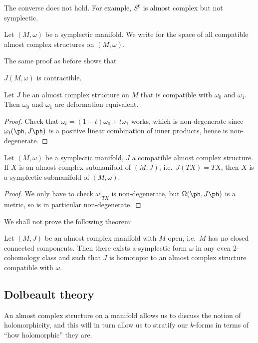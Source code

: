 \documentclass[a4paper]{article}
\begin{document}
The converse does not hold. For example, $S^6$ is almost complex but not symplectic.

\begin{notation}
  Let $(M, \omega)$ be a symplectic manifold. We write  for the space of all compatible almost complex structures on $(M, \omega)$.
\end{notation}
The same proof as before shows that
\begin{prop}
  $J(M, \omega)$ is contractible.\fakeqed
\end{prop}

\begin{prop}
  Let $J$ be an almost complex structure on $M$ that is compatible with $\omega_0$ and $\omega_1$. Then $\omega_0$ and $\omega_1$ are deformation equivalent.
\end{prop}

\begin{proof}
  Check that $\omega_t = (1 - t) \omega_0 + t \omega_1$ works, which is non-degenerate since $\omega_t(\ph, J\ph)$ is a positive linear combination of inner products, hence is non-degenerate.
\end{proof}

\begin{prop}
  Let $(M, \omega)$ be a symplectic manifold, $J$ a compatible almost complex structure. If $X$ is an almost complex submanifold of $(M, J)$, i.e.\ $J(TX) = TX$, then $X$ is a symplectic submanifold of $(M, \omega)$.
\end{prop}

\begin{proof}
  We only have to check $\omega|_{TX}$ is non-degenerate, but $\Omega(\ph, J\ph)$ is a metric, so is in particular non-degenerate.
\end{proof}

We shall not prove the following theorem:
\begin{thm}[Gromov]
  Let $(M, J)$ be an almost complex manifold with $M$ open, i.e.\ $M$ has no closed connected components. Then there exists a symplectic form $\omega$ in any even $2$-cohomology class and such that $J$ is homotopic to an almost complex structure compatible with $\omega$.\fakeqed
\end{thm}

\subsection{Dolbeault theory}
An almost complex structure on a manifold allows us to discuss the notion of holomorphicity, and this will in turn allow us to stratify our $k$-forms in terms of ``how holomorphic'' they are.
\end{document}
